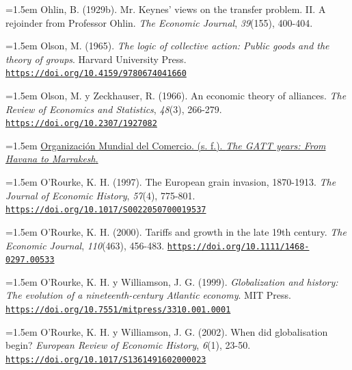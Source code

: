 \documentclass[10pt,a4paper]{article}
\begin{document}
{\sloppy\noindent\hangindent=1.5em Ohlin, B. (1929b). Mr. Keynes' views on the transfer problem. II. A rejoinder from Professor Ohlin. \textit{The Economic Journal}, \textit{39}(155), 400-404.\par}

{\sloppy\noindent\hangindent=1.5em Olson, M. (1965). \textit{The logic of collective action: Public goods and the theory of groups}. Harvard University Press. \href{https://doi.org/10.4159/9780674041660}{\nolinkurl{https://doi.org/10.4159/9780674041660}}\par}

{\sloppy\noindent\hangindent=1.5em Olson, M. y Zeckhauser, R. (1966). An economic theory of alliances. \textit{The Review of Economics and Statistics}, \textit{48}(3), 266-279. \href{https://doi.org/10.2307/1927082}{\nolinkurl{https://doi.org/10.2307/1927082}}\par}

{\sloppy\noindent\hangindent=1.5em \href{https://www.wto.org/english/thewto_e/whatis_e/tif_e/fact4_e.htm}{Organización Mundial del Comercio. (s. f.). \textit{The GATT years: From Havana to Marrakesh}.}\par}

{\sloppy\noindent\hangindent=1.5em O'Rourke, K. H. (1997). The European grain invasion, 1870-1913. \textit{The Journal of Economic History}, \textit{57}(4), 775-801. \href{https://doi.org/10.1017/S0022050700019537}{\nolinkurl{https://doi.org/10.1017/S0022050700019537}}\par}

{\sloppy\noindent\hangindent=1.5em O'Rourke, K. H. (2000). Tariffs and growth in the late 19th century. \textit{The Economic Journal}, \textit{110}(463), 456-483. \href{https://doi.org/10.1111/1468-0297.00533}{\nolinkurl{https://doi.org/10.1111/1468-0297.00533}}\par}

{\sloppy\noindent\hangindent=1.5em O'Rourke, K. H. y Williamson, J. G. (1999). \textit{Globalization and history: The evolution of a nineteenth-century Atlantic economy}. MIT Press. \href{https://doi.org/10.7551/mitpress/3310.001.0001}{\nolinkurl{https://doi.org/10.7551/mitpress/3310.001.0001}}\par}

{\sloppy\noindent\hangindent=1.5em O'Rourke, K. H. y Williamson, J. G. (2002). When did globalisation begin? \textit{European Review of Economic History}, \textit{6}(1), 23-50. \href{https://doi.org/10.1017/S1361491602000023}{\nolinkurl{https://doi.org/10.1017/S1361491602000023}}\par}
\end{document}
